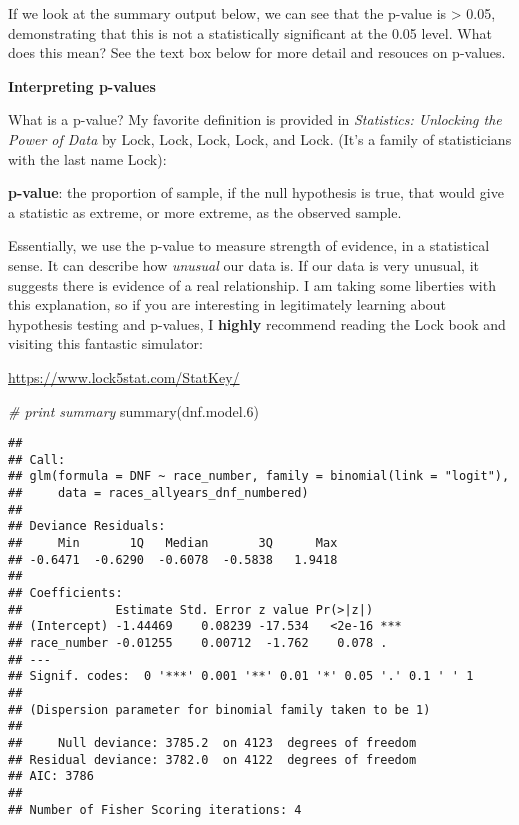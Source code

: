\documentclass[
]{book}
\newenvironment{Shaded}{\begin{snugshade}}{\end{snugshade}}
\newcommand{\CommentTok}[1]{\textcolor[rgb]{0.56,0.35,0.01}{\textit{#1}}}
\newcommand{\FloatTok}[1]{\textcolor[rgb]{0.00,0.00,0.81}{#1}}
\newcommand{\FunctionTok}[1]{\textcolor[rgb]{0.00,0.00,0.00}{#1}}
\newcommand{\NormalTok}[1]{#1}
\begin{document}
If we look at the summary output below, we can see that the p-value is \textgreater{} 0.05, demonstrating that this is not a statistically significant at the 0.05 level. What does this mean? See the text box below for more detail and resouces on p-values.

\begin{blackbox}

\begin{center}
\textbf{Interpreting p-values}

\end{center}

What is a p-value? My favorite definition is provided in \emph{Statistics: Unlocking the Power of Data} by Lock, Lock, Lock, Lock, and Lock. (It's a family of statisticians with the last name Lock):

\textbf{p-value}: the proportion of sample, if the null hypothesis is true, that would give a statistic as extreme, or more extreme, as the observed sample.

Essentially, we use the p-value to measure strength of evidence, in a statistical sense. It can describe how \emph{unusual} our data is. If our data is very unusual, it suggests there is evidence of a real relationship. I am taking some liberties with this explanation, so if you are interesting in legitimately learning about hypothesis testing and p-values, I \textbf{highly} recommend reading the Lock book and visiting this fantastic simulator:

\url{https://www.lock5stat.com/StatKey/}

\end{blackbox}

\begin{Shaded}
\begin{Highlighting}[]
\CommentTok{\# print summary}
\FunctionTok{summary}\NormalTok{(dnf.model}\FloatTok{.6}\NormalTok{)}
\end{Highlighting}
\end{Shaded}

\begin{verbatim}
## 
## Call:
## glm(formula = DNF ~ race_number, family = binomial(link = "logit"), 
##     data = races_allyears_dnf_numbered)
## 
## Deviance Residuals: 
##     Min       1Q   Median       3Q      Max  
## -0.6471  -0.6290  -0.6078  -0.5838   1.9418  
## 
## Coefficients:
##             Estimate Std. Error z value Pr(>|z|)    
## (Intercept) -1.44469    0.08239 -17.534   <2e-16 ***
## race_number -0.01255    0.00712  -1.762    0.078 .  
## ---
## Signif. codes:  0 '***' 0.001 '**' 0.01 '*' 0.05 '.' 0.1 ' ' 1
## 
## (Dispersion parameter for binomial family taken to be 1)
## 
##     Null deviance: 3785.2  on 4123  degrees of freedom
## Residual deviance: 3782.0  on 4122  degrees of freedom
## AIC: 3786
## 
## Number of Fisher Scoring iterations: 4
\end{verbatim}
\end{document}
